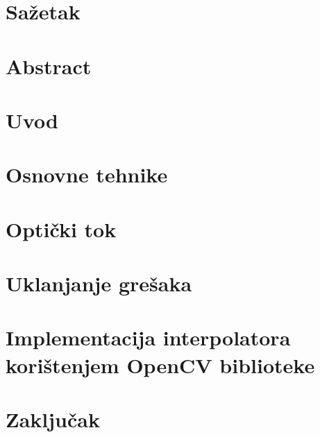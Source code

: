 \documentclass[12pt]{report}
\newcommand{\ch}{č}
\newcommand{\sh}{š}
\newcommand{\zh}{ž}
\begin{document}
\chapter*{Sa\zh etak}


\chapter*{Abstract}


\tableofcontents

\chapter{Uvod}


\chapter{Osnovne tehnike}


\chapter{Opti\ch ki tok}


\chapter{Uklanjanje gre\sh aka}


\chapter{Implementacija interpolatora kori\sh tenjem OpenCV biblioteke}


\chapter{Zaklju\ch ak}

\end{document}
